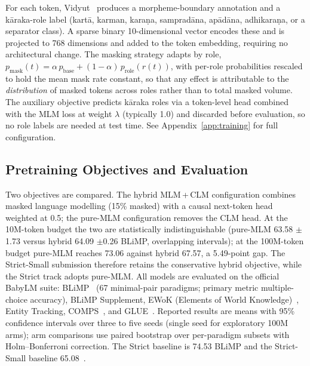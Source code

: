 For each token, Vidyut~\cite{Prasad2024Vidyut} produces a morpheme-boundary annotation and a kāraka-role label (kartā, karman, karaṇa, sampradāna, apādāna, adhikaraṇa, or a separator class). A sparse binary 10-dimensional vector encodes these and is projected to 768 dimensions and added to the token embedding, requiring no architectural change. The masking strategy adapts by role, $p_{\text{mask}}(t) = \alpha\,p_{\text{base}} + (1-\alpha)\,p_{\text{role}}(r(t))$, with per-role probabilities rescaled to hold the mean mask rate constant, so that any effect is attributable to the \emph{distribution} of masked tokens across roles rather than to total masked volume. The auxiliary objective predicts kāraka roles via a token-level head combined with the MLM loss at weight $\lambda$ (typically 1.0) and discarded before evaluation, so no role labels are needed at test time. See Appendix~\ref{app:training} for full configuration.

\subsection{Pretraining Objectives and Evaluation}

Two objectives are compared. The hybrid MLM\,+\,CLM configuration combines masked language modelling (15\% masked) with a causal next-token head weighted at 0.5; the pure-MLM configuration removes the CLM head. At the 10M-token budget the two are statistically indistinguishable (pure-MLM 63.58 $\pm$1.73 versus hybrid 64.09 $\pm$0.26 BLiMP, overlapping intervals); at the 100M-token budget pure-MLM reaches 73.06 against hybrid 67.57, a 5.49-point gap. The Strict-Small submission therefore retains the conservative hybrid objective, while the Strict track adopts pure-MLM. All models are evaluated on the official BabyLM suite: BLiMP~\cite{Warstadt2020BLiMP} (67 minimal-pair paradigms; primary metric multiple-choice accuracy), BLiMP Supplement, EWoK (Elements of World Knowledge)~\cite{Ivanova2024EWoK}, Entity Tracking, COMPS~\cite{Misra2023COMPS}, and GLUE~\cite{Wang2019GLUE}. Reported results are means with 95\% confidence intervals over three to five seeds (single seed for exploratory 100M arms); arm comparisons use paired bootstrap over per-paradigm subsets with Holm--Bonferroni correction. The Strict baseline is 74.53 BLiMP and the Strict-Small baseline 65.08~\cite{Hu2024BabyLM}.
